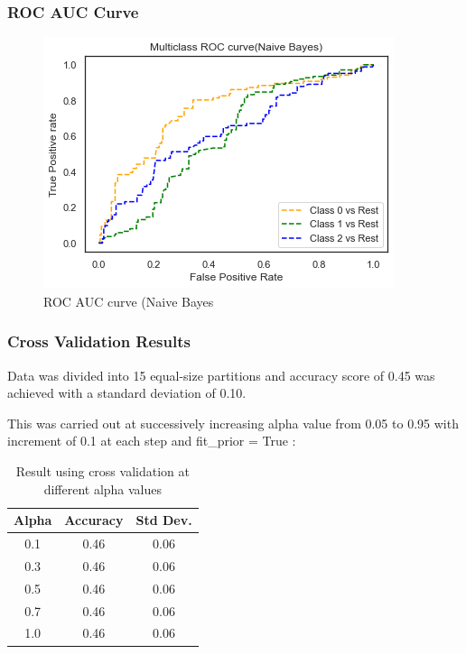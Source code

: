 \documentclass[12pt, letter]{article}
\begin{document}
\subsubsection{ROC AUC Curve}
\begin{figure}[h]
    \centering
    \includegraphics[scale = 0.8]{ROC_NB.png}
    \caption{ROC AUC curve (Naive Bayes}
    \label{ROC_DT}
\end{figure}

\pagebreak

\subsubsection{Cross Validation Results}

Data was divided into 15 equal-size partitions and accuracy score of 0.45 was achieved with a standard deviation of 0.10. 

This was carried out at successively increasing alpha value from 0.05 to 0.95 with increment of 0.1 at each step and fit\_prior = True : \\

\begin{table}[h]
\centering
\caption{Result using cross validation at different alpha values}
\label{tab:my_label}
\begin{tabular}{c|c|c}
\hline
Alpha & Accuracy & Std Dev. \\
\hline
\midrule
0.1 & 0.46 & 0.06 \\
0.3 & 0.46 & 0.06 \\
0.5 & 0.46 & 0.06 \\
0.7 & 0.46 & 0.06 \\
1.0 & 0.46 & 0.06 \\ 
\hline    
\end{tabular}
\end{table}
\end{document}
